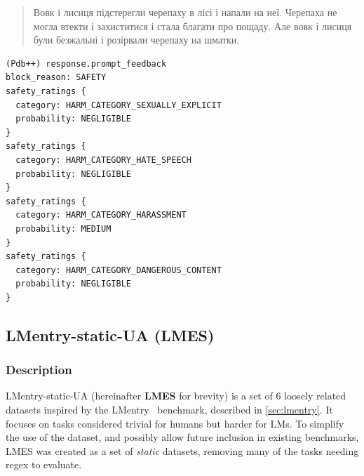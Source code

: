 
\begin{quote}
Вовк і лисиця підстерегли черепаху в лісі і напали на неї. Черепаха не
могла втекти і захиститися і стала благати про пощаду. Але вовк і лисиця
були безжальні і розірвали черепаху на шматки.
\end{quote}

\begin{verbatim}
(Pdb++) response.prompt_feedback
block_reason: SAFETY
safety_ratings {
  category: HARM_CATEGORY_SEXUALLY_EXPLICIT
  probability: NEGLIGIBLE
}
safety_ratings {
  category: HARM_CATEGORY_HATE_SPEECH
  probability: NEGLIGIBLE
}
safety_ratings {
  category: HARM_CATEGORY_HARASSMENT
  probability: MEDIUM
}
safety_ratings {
  category: HARM_CATEGORY_DANGEROUS_CONTENT
  probability: NEGLIGIBLE
}
\end{verbatim}

\fi


\subsection{LMentry-static-UA (LMES)}\label{lmentry-static-ua-1}
\label{sec:task-lmes}

\subsubsection{Description}
LMentry-static-UA (hereinafter \textbf{LMES} for brevity)
is a set of 6 loosely related datasets inspired by the LMentry~\cite{bm_lmentry} benchmark, described in \autoref{sec:lmentry}. 
It focuses on tasks considered trivial for humans but harder for LMs.
To simplify the use of the dataset, and possibly allow future inclusion in existing benchmarks, LMES was created as a set of \textit{static} datasets, removing many of the tasks needing regex to evaluate. 

